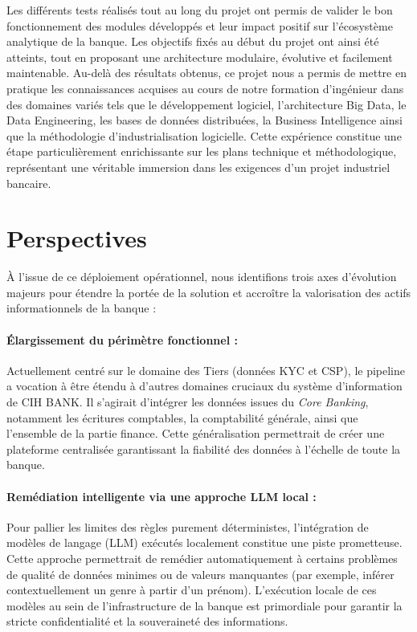 Les différents tests réalisés tout au long du projet ont permis de valider le bon fonctionnement des modules développés et leur impact positif sur l'écosystème analytique de la banque. Les objectifs fixés au début du projet ont ainsi été atteints, tout en proposant une architecture modulaire, évolutive et facilement maintenable. Au-delà des résultats obtenus, ce projet nous a permis de mettre en pratique les connaissances acquises au cours de notre formation d’ingénieur dans des domaines variés tels que le développement logiciel, l'architecture Big Data, le Data Engineering, les bases de données distribuées, la Business Intelligence ainsi que la méthodologie d'industrialisation logicielle. Cette expérience constitue une étape particulièrement enrichissante sur les plans technique et méthodologique, représentant une véritable immersion dans les exigences d’un projet industriel bancaire.

\section*{Perspectives}
À l'issue de ce déploiement opérationnel, nous identifions trois axes d'évolution majeurs pour étendre la portée de la solution et accroître la valorisation des actifs informationnels de la banque :

\paragraph{Élargissement du périmètre fonctionnel :} Actuellement centré sur le domaine des Tiers (données KYC et CSP), le pipeline a vocation à être étendu à d'autres domaines cruciaux du système d'information de CIH BANK. Il s'agirait d'intégrer les données issues du \textit{Core Banking}, notamment les écritures comptables, la comptabilité générale, ainsi que l'ensemble de la partie finance. Cette généralisation permettrait de créer une plateforme centralisée garantissant la fiabilité des données à l'échelle de toute la banque.

\paragraph{Remédiation intelligente via une approche LLM local :} Pour pallier les limites des règles purement déterministes, l'intégration de modèles de langage (LLM) exécutés localement constitue une piste prometteuse. Cette approche permettrait de remédier automatiquement à certains problèmes de qualité de données minimes ou de valeurs manquantes (par exemple, inférer contextuellement un genre à partir d'un prénom). L'exécution locale de ces modèles au sein de l'infrastructure de la banque est primordiale pour garantir la stricte confidentialité et la souveraineté des informations.


